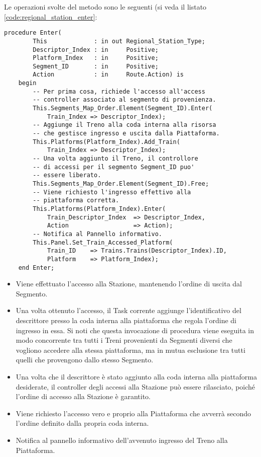 	Le operazioni svolte del metodo  sono le seguenti (si veda il listato \ref{code:regional_station_enter}:
	
\begin{lstlisting}[caption=\small{Metodo \ttt{Enter} fornito dal tipo \ttt{Regional\_Station\_Type}},label=code:regional_station_enter]
	procedure Enter(
		This             : in out Regional_Station_Type;
		Descriptor_Index : in     Positive;
		Platform_Index   : in     Positive;
		Segment_ID       : in 	  Positive;
		Action           : in 	  Route.Action) is
	begin
		-- Per prima cosa, richiede l'accesso all'access
		-- controller associato al segmento di provenienza.
		This.Segments_Map_Order.Element(Segment_ID).Enter(
			Train_Index	=> Descriptor_Index);
		-- Aggiunge il Treno alla coda interna alla risorsa 
		-- che gestisce ingresso e uscita dalla Piattaforma.
		This.Platforms(Platform_Index).Add_Train(
			Train_Index	=> Descriptor_Index);
		-- Una volta aggiunto il Treno, il controllore
		-- di accessi per il segmento Segment_ID puo'
		-- essere liberato.
		This.Segments_Map_Order.Element(Segment_ID).Free;
		-- Viene richiesto l'ingresso effettivo alla 
		-- piattaforma corretta.
		This.Platforms(Platform_Index).Enter(
			Train_Descriptor_Index 	=> Descriptor_Index,
			Action					=> Action);
		-- Notifica al Pannello informativo.
		This.Panel.Set_Train_Accessed_Platform(
			Train_ID	=> Trains.Trains(Descriptor_Index).ID,
			Platform 	=> Platform_Index);
	end Enter;
\end{lstlisting}
	
	\begin{itemize}
	
		\item Viene effettuato l'accesso alla Stazione, mantenendo l'ordine di uscita dal Segmento.

		\item Una volta ottenuto l'accesso, il Task corrente aggiunge l'identificativo del descrittore presso la coda interna alla piattaforma che regola l'ordine di ingresso in essa.
		Si noti che questa invocazione di procedura viene eseguita in modo concorrente tra tutti i Treni provenienti da Segmenti diversi che vogliono accedere alla stessa piattaforma, ma in mutua esclusione tra tutti quelli che provengono dallo stesso Segmento.

		\item Una volta che il descrittore è stato aggiunto alla coda interna alla piattaforma desiderate, il controller degli accessi alla Stazione può essere rilasciato, poiché l'ordine di accesso alla Stazione è garantito.

		\item Viene richiesto l'accesso vero e proprio alla Piattaforma che avverrà secondo l'ordine definito dalla propria coda interna.

		\item Notifica al pannello informativo dell'avvenuto ingresso del Treno alla Piattaforma.

	\end{itemize}
	
